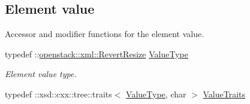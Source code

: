 \subsection*{Element value}
\label{_amgrp2ee2eae1a8c390ea033f241c027da8d6}
Accessor and modifier functions for the element value. \begin{DoxyCompactItemize}
\item 
\hypertarget{classopenstack_1_1xml_1_1RevertResize___a3a765434a67e3973b457c255721cb539}{
typedef ::\hyperlink{classopenstack_1_1xml_1_1RevertResize}{openstack::xml::RevertResize} \hyperlink{classopenstack_1_1xml_1_1RevertResize___a3a765434a67e3973b457c255721cb539}{ValueType}}
\label{classopenstack_1_1xml_1_1RevertResize___a3a765434a67e3973b457c255721cb539}

\begin{DoxyCompactList}\small\item\em Element value type. \item\end{DoxyCompactList}\item 
\hypertarget{classopenstack_1_1xml_1_1RevertResize___a836d993451da868b01e50e033c5fed0b}{
typedef ::xsd::cxx::tree::traits$<$ \hyperlink{classopenstack_1_1xml_1_1RevertResize}{ValueType}, char $>$ \hyperlink{classopenstack_1_1xml_1_1RevertResize___a836d993451da868b01e50e033c5fed0b}{ValueTraits}}
\label{classopenstack_1_1xml_1_1RevertResize___a836d993451da868b01e50e033c5fed0b}


\end{DoxyCompactItemize}

